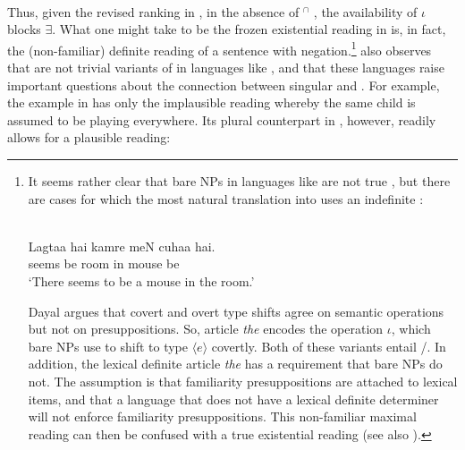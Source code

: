 \documentclass[output=paper,
modfonts
]{langscibook}
\begin{document}
	\ea \label{ex:despic:37}
	 \\
	 \citep[420]{Dayal2004} 
	\z 
	\z 
	
	Thus, given the revised ranking in , in the absence of $^\cap$ , the availability of $\iota$ blocks $\exists$. What one might take to be the frozen existential reading in  is, in fact, the (non-familiar) definite reading of a sentence with negation.\footnote{It seems rather clear that bare NPs in languages like  are not true , but there are cases for which the most natural translation into  uses an indefinite \citep[1101]{Dayal2011}: \newpage
		\begin{exe}
		 \label{ex:despic:n9}
		\textnormal{} \\
		\gll Lagtaa hai kamre meN cuhaa hai. \\
		seems be room in mouse be \\ 
		\glt `There seems to be a mouse in the room.'
		\end{exe}
		Dayal argues that covert and overt type shifts agree on semantic operations but not on presuppositions. So,  article \textit{the} encodes the operation $\iota$, which  bare NPs use to shift to type $\langle e\rangle$ covertly. Both of these variants entail /. In addition, the lexical definite article \textit{the} has a  requirement that  bare NPs do not. The assumption is that familiarity presuppositions are attached to lexical items, and that a language that does not have a lexical definite determiner will not enforce familiarity presuppositions. This non-familiar maximal
		reading can then be confused with a true existential reading (see also \citealt{Heim2011}).} \citet{Dayal2004} also observes that  are not trivial variants of  in languages like , and that these languages raise important questions about the connection between singular  and . For example, the  example in  has only the implausible reading whereby the same child is assumed to be playing everywhere. Its plural counterpart in , however, readily allows for a plausible reading:\newpage
	
\end{document}
